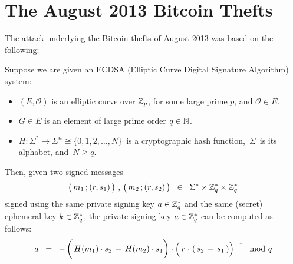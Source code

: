 
\section{The August 2013 Bitcoin Thefts}
\setcounter{theorem}{0}
\setcounter{equation}{0}


The attack underlying the Bitcoin thefts of August 2013 was based on the following:
\begin{proposition}
\mbox{}
\vskip 0.1cm
\noindent
Suppose we are given an ECDSA (Elliptic Curve Digital Signature Algorithm) system:
\begin{itemize}
\item
	$(E,\mathcal{O})$ is an elliptic curve over $\mathbb{Z}_{p}$, for some large prime $p$,
	and $\mathcal{O} \in E$.
\item
	$G \in E$ is an element of large prime order $q \in \mathbb{N}$.
\item
	$H : \Sigma^{*} \longrightarrow \Sigma^{n} \cong \{0,1,2,\ldots,N\}$\,
	is a cryptographic hash function,
	\,$\Sigma$\, is its alphabet, and \,$N \geq q$.
\end{itemize}
Then, given two signed messages
\begin{equation*}
\left(\,m_{1}\,\overset{{\color{white}.}}{;}\,(r,s_{1})\,\right)
\,,\,
\left(\,m_{2}\,\overset{{\color{white}.}}{;}\,(r,s_{2})\,\right)
\;\; \in \;\;
	\Sigma^{*} \times \Z_{q}^{*} \times \Z_{q}^{*}
\end{equation*}
signed using the same
private signing key $a \in \mathbb{Z}_{q}^{*}$ and the same (secret) ephemeral key $k \in \mathbb{Z}_{q}^{*}$,
the private signing key $a \in \mathbb{Z}_{q}^{*}$ can be computed as follows:
\begin{equation*}
a
\;\;=\;\;
	- \left(\,H(m_{1}) \cdot s_{2} \, \overset{{\color{white}1}}{-} \, H(m_{2}) \cdot s_{1} \right)
	\cdot
	\left(\,r \overset{{\color{white}1}}{\cdot} \left(\, s_{2} \,-\, s_{1} \,\right)\right)^{-1}
	 \mod q
\end{equation*}
\end{proposition}

\proof

